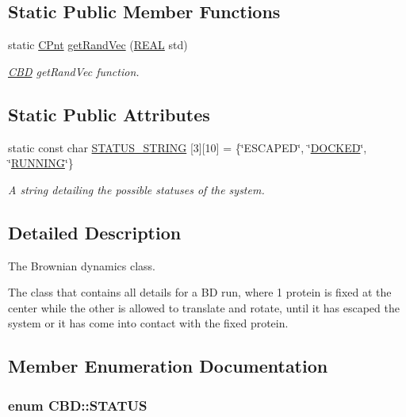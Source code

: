 \subsection*{Static Public Member Functions}
\begin{DoxyCompactItemize}
\item 
static \hyperlink{classCPnt}{C\-Pnt} \hyperlink{classCBD_a9ad6f87e7436fa716a470e97f0ec836f}{get\-Rand\-Vec} (\hyperlink{util_8h_a5821460e95a0800cf9f24c38915cbbde}{R\-E\-A\-L} std)
\begin{DoxyCompactList}\small\item\em \hyperlink{classCBD}{C\-B\-D} get\-Rand\-Vec function. \end{DoxyCompactList}\end{DoxyCompactItemize}
\subsection*{Static Public Attributes}
\begin{DoxyCompactItemize}
\item 
static const char \hyperlink{classCBD_a20beab0b7b100a3d5baf2b3924453641}{S\-T\-A\-T\-U\-S\-\_\-\-S\-T\-R\-I\-N\-G} \mbox{[}3\mbox{]}\mbox{[}10\mbox{]} = \{\char`\"{}E\-S\-C\-A\-P\-E\-D\char`\"{}, \char`\"{}\hyperlink{classCBD_ad133262cc326c96e755511655e632e57ac0a9f8a84559135662cf71c4893a99ef}{D\-O\-C\-K\-E\-D}\char`\"{}, \char`\"{}\hyperlink{classCBD_ad133262cc326c96e755511655e632e57a4ba124eb7b8e8a8c32491bc599f62851}{R\-U\-N\-N\-I\-N\-G}\char`\"{}\}
\begin{DoxyCompactList}\small\item\em A string detailing the possible statuses of the system. \end{DoxyCompactList}\end{DoxyCompactItemize}


\subsection{Detailed Description}
The Brownian dynamics class. 

The class that contains all details for a B\-D run, where 1 protein is fixed at the center while the other is allowed to translate and rotate, until it has escaped the system or it has come into contact with the fixed protein. 

\subsection{Member Enumeration Documentation}
\hypertarget{classCBD_ad133262cc326c96e755511655e632e57}{
\subsubsection[{S\-T\-A\-T\-U\-S}]{\setlength{\rightskip}{0pt plus 5cm}enum {\bf C\-B\-D\-::\-S\-T\-A\-T\-U\-S}}}\label{classCBD_ad133262cc326c96e755511655e632e57}


